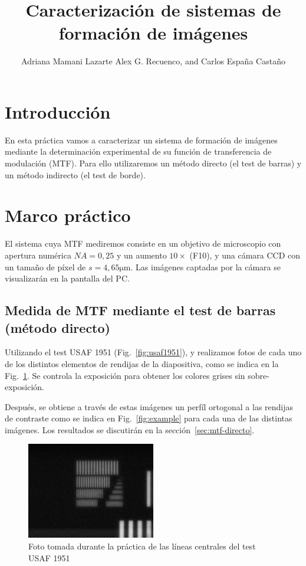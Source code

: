 \documentclass{./packages/optica-article}
\begin{document}
\title{Caracterización de sistemas de formación de imágenes}

\author{Adriana Mamani Lazarte Alex G. Recuenco, and Carlos España Castaño}

\address{Universidad Complutense de Madrid, Madrid, PC 28040, España}

\section{Introducción}
En esta práctica vamos a caracterizar un sistema de formación de imágenes mediante la determinación experimental de su función de transferencia de modulación (MTF). Para ello utilizaremos un método directo (el test de barras) y un método indirecto (el test de borde). 


\section{Marco práctico}
El sistema cuya MTF mediremos consiste en un objetivo de microscopio con apertura numérica $NA = 0,25$ y un aumento $10\times$ (F10), y una cámara CCD con un tamaño de píxel de $s=4,65 \unit{\micro\meter}$. Las imágenes captadas por la cámara se visualizarán en la pantalla del PC.

\subsection{Medida de MTF mediante el test de barras (método directo)}

Utilizando el test USAF 1951 (Fig.~\ref{fig:usaf1951}), y realizamos fotos de cada uno de los distintos elementos de rendijas de la diapositiva, como se indica en la Fig.~\ref{fig:usafpic}. Se controla la exposición para obtener los colores grises sin sobre-exposición.

Después, se obtiene a través de estas imágenes un perfíl ortogonal a las rendijas de contraste como se indica en Fig.~\ref{fig:example} para cada una de las distintas imágenes. Los resultados se discutirán en la sección~\ref{sec:mtf-directo}.

\begin{figure}[p]
	\centering
	\includegraphics[width=0.5\textwidth]{smallest_lines}
	\caption{Foto tomada durante la práctica de las líneas centrales del test USAF 1951}\label{fig:usafpic}
\end{figure}
\end{document}
